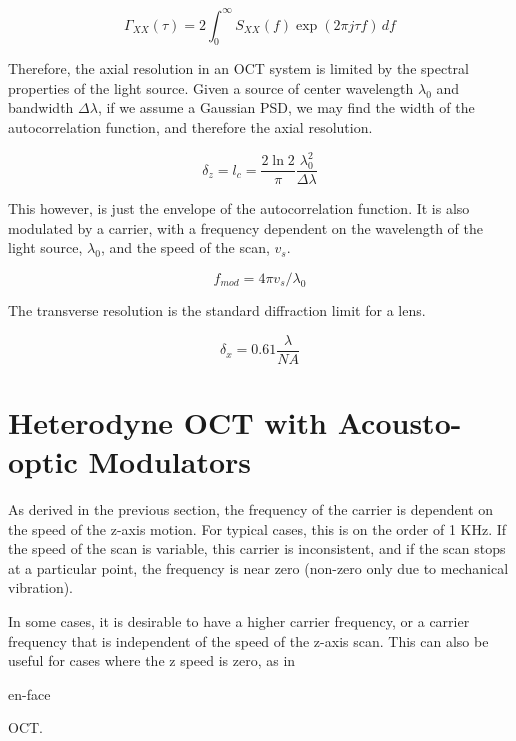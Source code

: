 \begin{equation}
\Gamma_{XX}(\tau) = 2 \int_{0}^\infty S_{XX}(f) \exp(2 \pi j \tau f) \,df
\end{equation}

Therefore, the axial resolution in an OCT system is limited by the spectral properties of the light source. Given a source of center wavelength $\lambda_0$ and bandwidth $\Delta \lambda$, if we assume a Gaussian PSD, we may find the width of the autocorrelation function, and therefore the axial resolution. \cite{fercher}

\begin{equation} \label{eq:ares}
\delta_z = l_c = \frac{2 \ln{2}}{\pi} \frac{\lambda_0^2}{\Delta \lambda}
\end{equation}

This however, is just the envelope of the autocorrelation function. It is also modulated by a carrier, with a  frequency dependent on the wavelength of the light source, $\lambda_0$, and the speed of the scan, $v_s$. \cite{fercher}

\begin{equation} \label{eq:carrier}
f_{mod} = 4 \pi v_s / \lambda_0
\end{equation}

The transverse resolution is the standard diffraction limit for a lens. \cite{hecht}

\begin{equation} \label{eq:tres}
\delta_x = 0.61 \frac{\lambda}{NA}
\end{equation}

\section{Heterodyne OCT with Acousto-optic Modulators}

As derived in the previous section, the frequency of the carrier is dependent on the speed of the z-axis motion. For typical cases, this is on the order of 1 KHz. If the speed of the scan is variable, this carrier is inconsistent, and if the scan stops at a particular point, the frequency is near zero (non-zero only due to mechanical vibration).

In some cases, it is desirable to have a higher carrier frequency, or a carrier frequency that is independent of the speed of the z-axis scan. This can also be useful for cases where the z speed is zero, as in \begin{em}en-face\end{em} OCT. \cite{bouma}

